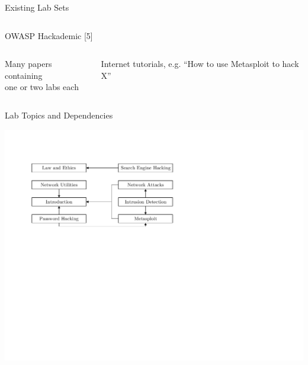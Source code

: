 \documentclass{beamer}
\begin{document}
\begin{frame}{Existing Lab Sets}
\begin{columns}
\begin{column}{0.5\textwidth}
\begin{center}
					OWASP Hackademic [5]
				\end{center}
              		\end{column}
		\end{columns}			
		\vfill
		\begin{columns}
            		\begin{column}{0.5\textwidth}
            		\pause	
			\begin{center}	
			Many papers containing\\one or two labs each
			\end{center}
             		\end{column}
			\pause
            		\begin{column}{0.5\textwidth}				
			\begin{center}
			Internet tutorials, e.g. ``How to use Metasploit to hack X''
			\end{center}
              		\end{column}
		\end{columns}	
	\end{frame}
	
	\begin{frame}{Lab Topics and Dependencies}
		\begin{center}
		\includegraphics[width=\textwidth,clip=true, trim=0.85in 4.75in 4.5in 1.2in]{../paper/dependencies-between-labs.pdf}
		\end{center}		
	\end{frame}	
	
\end{document}
